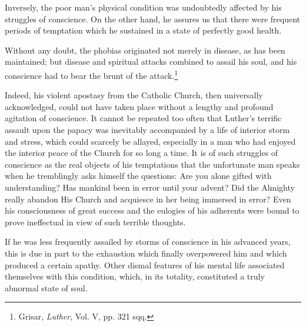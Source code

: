 Inversely, the poor man’s physical condition was undoubtedly affected
by his struggles of conscience. On the other hand, he
assures us that there were frequent periods of temptation which he
sustained in a state of perfectly good health.

Without any doubt, the phobias originated not merely in disease,
as has been maintained; but disease and spiritual attacks combined
to assail his soul, and his conscience had to bear the brunt of the attack.\footnote{Grisar, \textit{Luther}, Vol. V, pp. 321 sqq.}

Indeed, his violent apostasy from the Catholic Church, then universally
acknowledged, could not have taken place without a lengthy
and profound agitation of conscience. It cannot be repeated too
often that Luther’s terrific assault upon the papacy was inevitably
accompanied by a life of interior storm and stress, which could
scarcely be allayed, especially in a man who had enjoyed the interior
peace of the Church for so long a time. It is of such struggles of
conscience as the real objects of his temptations that the unfortunate
man speaks when he tremblingly asks himself the questions: Are
you alone gifted with understanding? Has mankind been in error
until your advent? Did the Almighty really abandon His Church and
acquiesce in her being immersed in error? Even his consciousness of
great success and the eulogies of his adherents were bound to prove
ineffectual in view of such terrible thoughts.

If he was less frequently assailed by storms of conscience in his
advanced years, this is due in part to the exhaustion which finally overpowered
him and which produced a certain apathy. Other dismal
features of his mental life associated themselves with this condition,
which, in its totality, constituted a truly abnormal state of soul.
